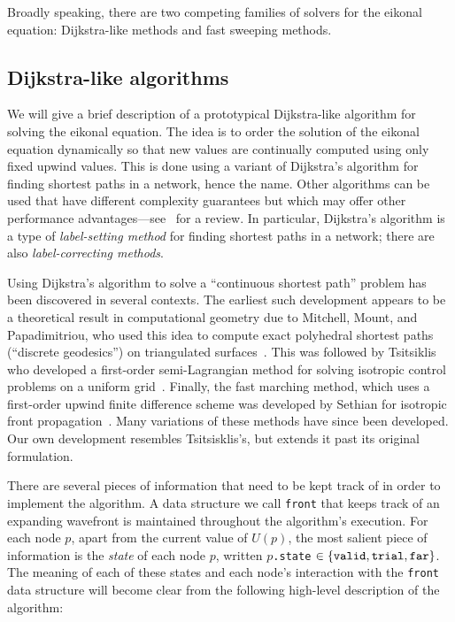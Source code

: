 \documentclass[eikonal.tex]{subfiles}
\begin{document}
Broadly speaking, there are two competing families of solvers for the
eikonal equation: Dijkstra-like methods and fast sweeping methods. 

\subsection{Dijkstra-like algorithms}\label{ssec:dijkstra-like}
We will give a brief description of a prototypical Dijkstra-like
algorithm for solving the eikonal equation. The idea is to order the
solution of the eikonal equation dynamically so that new values are
continually computed using only fixed upwind values. This is done
using a variant of Dijkstra's algorithm for finding shortest paths in
a network, hence the name. Other algorithms can be used that have
different complexity guarantees but which may offer other performance
advantages---see~\cite{chacon2012fast} for a review. In particular,
Dijkstra's algorithm is a type of \emph{label-setting method} for
finding shortest paths in a network; there are also
\emph{label-correcting methods}.

Using Dijkstra's algorithm to solve a ``continuous shortest path''
problem has been discovered in several contexts. The earliest such
development appears to be a theoretical result in computational
geometry due to Mitchell, Mount, and Papadimitriou, who used this idea
to compute exact polyhedral shortest paths (``discrete geodesics'') on
triangulated surfaces~\cite{mitchell1987discrete}. This was followed
by Tsitsiklis who developed a first-order semi-Lagrangian method for
solving isotropic control problems on a uniform
grid~\cite{tsitsiklis1995efficient}. Finally, the fast marching
method, which uses a first-order upwind finite difference scheme was
developed by Sethian for isotropic front
propagation~\cite{sethian1996fast}. Many variations of these methods
have since been developed. Our own development resembles
Tsitsisklis's, but extends it past its original formulation.

There are several pieces of information that need to be kept track of
in order to implement the algorithm. A data structure we call
\texttt{front} that keeps track of an expanding wavefront is
maintained throughout the algorithm's execution. For each node $p$,
apart from the current value of $U(p)$, the most salient piece of
information is the \emph{state} of each node $p$, written
$p$\texttt{.state}
$\in \left\{\texttt{valid}, \texttt{trial}, \texttt{far}\right\}$. The meaning
of each of these states and each node's interaction with the
\texttt{front} data structure will become clear from the following
high-level description of the algorithm:
\end{document}
